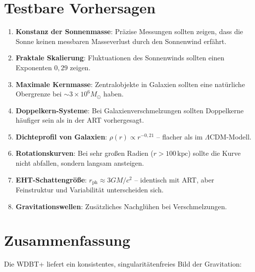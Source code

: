 \documentclass[12pt,a4paper]{article}
\begin{document}
\section{Testbare Vorhersagen}

\begin{enumerate}
\item \textbf{Konstanz der Sonnenmasse}: Präzise Messungen sollten zeigen, dass die Sonne keinen messbaren Masseverlust durch den Sonnenwind erfährt.
\item \textbf{Fraktale Skalierung}: Fluktuationen des Sonnenwinds sollten einen Exponenten $0{,}29$ zeigen.
\item \textbf{Maximale Kernmasse}: Zentralobjekte in Galaxien sollten eine natürliche Obergrenze bei $\sim 3 \times 10^6 M_\odot$ haben.
\item \textbf{Doppelkern-Systeme}: Bei Galaxienverschmelzungen sollten Doppelkerne häufiger sein als in der ART vorhergesagt.
\item \textbf{Dichteprofil von Galaxien}: $\rho(r) \propto r^{-0{,}21}$ – flacher als im $\Lambda$CDM-Modell.
\item \textbf{Rotationskurven}: Bei sehr großen Radien ($r > 100\,\text{kpc}$) sollte die Kurve nicht abfallen, sondern langsam ansteigen.
\item \textbf{EHT-Schattengröße}: $r_{\text{ph}} \approx 3GM/c^2$ – identisch mit ART, aber Feinstruktur und Variabilität unterscheiden sich.
\item \textbf{Gravitationswellen}: Zusätzliches Nachglühen bei Verschmelzungen.
\end{enumerate}

\section{Zusammenfassung}

Die WDBT+ liefert ein konsistentes, singularitätenfreies Bild der Gravitation:
\end{document}
